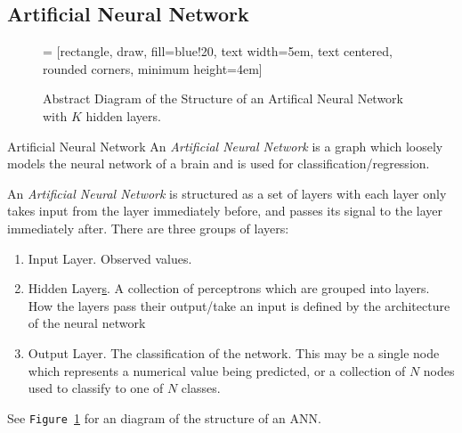 \documentclass[11pt,a4paper]{article}
\begin{document}
\subsection{Artificial Neural Network} \label{sec_ArtificialNeuralNetwork}

  \begin{figure}[ht!]
    \centering
     = [rectangle, draw, fill=blue!20, text width=5em, text centered, rounded corners, minimum height=4em]
    \caption{Abstract Diagram of the Structure of an Artifical Neural Network with $K$ hidden layers.}
    \label{fig_ANN}
  \end{figure}

  \begin{definition}{Artificial Neural Network}
    An \textit{Artificial Neural Network} is a graph which loosely models the neural network of a brain and is used for classification/regression.
    \par An \textit{Artificial Neural Network} is structured as a set of layers with each layer only takes input from the layer immediately before, and passes its signal to the layer immediately after. There are three groups of layers:
    \begin{enumerate}
      \item Input Layer. Observed values.
      \item Hidden Layer\underline{s}. A collection of perceptrons which are grouped into layers. How the layers pass their output/take an input is defined by the architecture of the neural network
      \item Output Layer. The classification of the network. This may be a single node which represents a numerical value being predicted, or a collection of $N$ nodes used to classify to one of $N$ classes.
    \end{enumerate}
    See \texttt{Figure \ref{fig_ANN}} for an diagram of the structure of an ANN.
  \end{definition}
\end{document}
